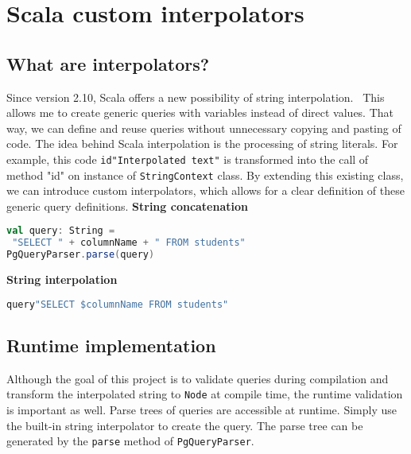 \section{Scala custom interpolators}
\subsection{What are interpolators?}
Since version 2.10, Scala offers a new possibility of string interpolation.~\cite{String interpolation} This allows me to create generic queries with variables instead of direct values. That way, we can define and reuse queries without unnecessary copying and pasting of code. The idea behind Scala interpolation is the processing of string literals. For example, this code  \verb|id"Interpolated text"| is transformed into the call of method "id" on instance of \texttt{StringContext} class. By extending this existing class, we can introduce custom interpolators, which allows for a clear definition of these generic query definitions.
\bigskip
\newline
\textbf{String concatenation}
\begin{lstlisting}[language=scala, basicstyle=\ttfamily, showstringspaces=false]
val query: String = 
 "SELECT " + columnName + " FROM students"
PgQueryParser.parse(query)
\end{lstlisting}
\bigskip
\textbf{String interpolation}
\begin{lstlisting}[language=scala, basicstyle=\ttfamily, showstringspaces=false]
query"SELECT $columnName FROM students"
\end{lstlisting}

\subsection{Runtime implementation}
Although the goal of this project is to validate queries during compilation and transform the interpolated string to \texttt{Node} at compile time, the runtime validation is important as well. Parse trees of queries are accessible at runtime. Simply use the built-in string interpolator to create the query. The parse tree can be generated by the \texttt{parse} method of \texttt{PgQueryParser}.